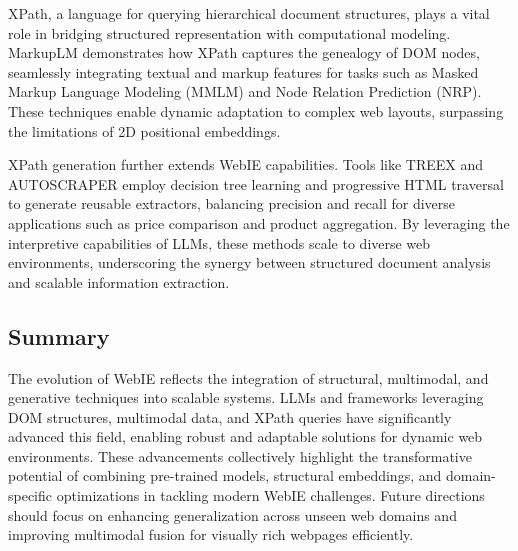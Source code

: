 \documentclass[a4paper]{article}
\begin{document}
XPath, a language for querying hierarchical document structures, plays a vital role in bridging structured representation with computational modeling. MarkupLM\cite{DBLP:journals/corr/abs-2110-08518} demonstrates how XPath captures the genealogy of DOM nodes, seamlessly integrating textual and markup features for tasks such as Masked Markup Language Modeling (MMLM) and Node Relation Prediction (NRP). These techniques enable dynamic adaptation to complex web layouts, surpassing the limitations of 2D positional embeddings.

XPath generation further extends WebIE capabilities. Tools like TREEX \cite{10.1145/3018661.3018740} and AUTOSCRAPER\cite{huang2024autoscraperprogressiveunderstandingweb} employ decision tree learning and progressive HTML traversal to generate reusable extractors, balancing precision and recall for diverse applications such as price comparison and product aggregation. By leveraging the interpretive capabilities of LLMs, these methods scale to diverse web environments, underscoring the synergy between structured document analysis and scalable information extraction.

\subsection{Summary}

The evolution of WebIE reflects the integration of structural, multimodal, and generative techniques into scalable systems. LLMs and frameworks leveraging DOM structures, multimodal data, and XPath queries have significantly advanced this field, enabling robust and adaptable solutions for dynamic web environments. These advancements collectively highlight the transformative potential of combining pre-trained models, structural embeddings, and domain-specific optimizations in tackling modern WebIE challenges. Future directions should focus on enhancing generalization across unseen web domains and improving multimodal fusion for visually rich webpages efficiently.
\end{document}
